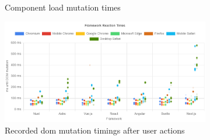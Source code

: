 \documentclass[a4paper, 12pt]{article}
\begin{document}
\begin{figure}[!h]
\begin{subfigure}{0.49\linewidth}
\begin{center}
    \end{center}
    \caption{Component load mutation times}
    \label{fig:Playwright:pageLoadMutations:total}
  \end{subfigure}
  \begin{subfigure}{0.49\linewidth}
    \begin{center}
      \includegraphics[width=\linewidth, keepaspectratio]{img/playwright-results/userActions_byUserAction/total.png}
    \end{center}
    \caption{Recorded \acrshort{dom} mutation timings after user actions}
    \label{fig:playwrightResults:total}
  \end{subfigure}
  \caption{}
\end{figure}
\end{document}
